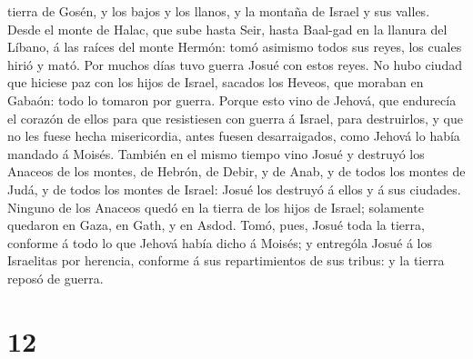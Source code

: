 tierra de Gosén, y los bajos y los llanos, y la montaña de Israel y sus
valles.  Desde el monte de Halac, que sube hasta Seir,
hasta Baal-gad en la llanura del Líbano, á las raíces del monte Hermón:
tomó asimismo todos sus reyes, los cuales hirió y mató. 
Por muchos días tuvo guerra Josué con estos reyes.  No
hubo ciudad que hiciese paz con los hijos de Israel, sacados los Heveos,
que moraban en Gabaón: todo lo tomaron por guerra. 
Porque esto vino de Jehová, que endurecía el corazón de ellos para que
resistiesen con guerra á Israel, para destruirlos, y que no les fuese
hecha misericordia, antes fuesen desarraigados, como Jehová lo había
mandado á Moisés.  También en el mismo tiempo vino Josué
y destruyó los Anaceos de los montes, de Hebrón, de Debir, y de Anab, y
de todos los montes de Judá, y de todos los montes de Israel: Josué los
destruyó á ellos y á sus ciudades.  Ninguno de los
Anaceos quedó en la tierra de los hijos de Israel; solamente quedaron en
Gaza, en Gath, y en Asdod.  Tomó, pues, Josué toda la
tierra, conforme á todo lo que Jehová había dicho á Moisés; y entrególa
Josué á los Israelitas por herencia, conforme á sus repartimientos de
sus tribus: y la tierra reposó de guerra.

\hypertarget{section-11}{%
\section{12}\label{section-11}}

